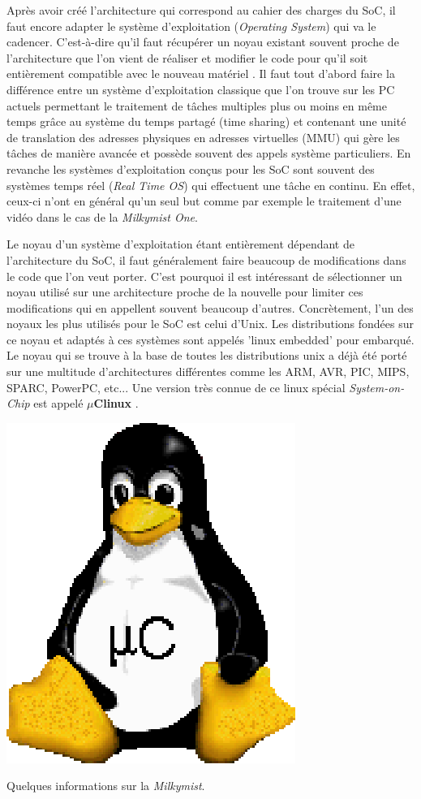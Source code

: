 Après avoir créé l'architecture qui correspond au cahier des charges du SoC,
il faut encore adapter le système d'exploitation (\textit{Operating System}) qui va le cadencer. C'est-à-dire qu'il faut récupérer un noyau existant
souvent proche de l'architecture que l'on vient de réaliser et modifier le code
pour qu'il soit entièrement compatible avec le nouveau matériel \cite{MILKY_SITE}.  Il faut tout
d'abord faire la différence entre un système d'exploitation classique que l'on
trouve sur les PC actuels permettant le traitement de tâches multiples plus ou
moins en même temps grâce au système du temps partagé (time sharing) et contenant une unité de translation des adresses physiques en adresses virtuelles
(MMU) qui gère les tâches de manière avancée et possède souvent des appels
système particuliers. En revanche les systèmes d'exploitation conçus pour les
SoC sont souvent des systèmes temps réel (\textit{Real Time OS}) qui effectuent
une tâche en continu. En effet, ceux-ci n'ont en général qu'un seul but comme
par exemple le traitement d'une vidéo dans le cas de la \textit{Milkymist One}.


Le noyau d'un système d'exploitation étant entièrement dépendant de
l'architecture du SoC, il faut généralement faire beaucoup de
modifications dans le code que l'on veut porter. C'est pourquoi il est
intéressant de sélectionner un noyau utilisé sur une architecture proche de la
nouvelle pour limiter ces modifications qui en appellent souvent beaucoup
d'autres.  Concrètement, l'un des noyaux les plus utilisés pour le SoC
est celui d'Unix. Les distributions fondées sur ce noyau et adaptés à ces
systèmes sont appelés 'linux embedded' pour embarqué. Le noyau qui se trouve à
la base de toutes les distributions unix a déjà été porté sur une multitude
d'architectures différentes comme les ARM, AVR, PIC, MIPS, SPARC, PowerPC,
etc... Une version très connue de ce linux spécial \textit{System-on-Chip} est appelé
{\bf $\mu$Clinux} \cite{UCLINUX}.  \medskip

\begin{center} \includegraphics[scale=0.4]{uclinux.eps} \end{center}
\vspace{15px} {\Large Quelques informations sur la \textit{Milkymist}.}


